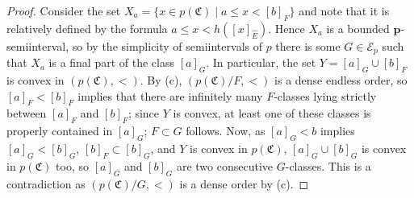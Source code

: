 \documentclass{amsart}
\theoremstyle{definition}
\theoremstyle{definition}
\newcommand{\Mon}{\mathfrak C}
\begin{document}
\begin{proof}
Consider the set $X_a=\{x\in p(\Mon)\mid a\leqslant x<[b]_F\}$ and note that it is relatively defined by the formula $a\leqslant x<h([x]_{\hat E})$. Hence $X_a$ is
a bounded $\mathbf p$-semiinterval, so by the simplicity of semiintervals of $p$ there is some $G\in\mathcal E_p$ such that $X_a$ is a final part of the class $[a]_G$. In particular, the set $Y=[a]_G\cup [b]_F$ is convex in $(p(\Mon),<)$. By (c), $(p(\Mon)/F,<)$ is a dense endless order, so $[a]_F<[b]_F$ implies that there are infinitely many $F$-classes lying strictly between $[a]_F$ and $[b]_F$; since $Y$ is convex, at least one of these classes is properly contained in $[a]_G$; $F\subset G$ follows. 
Now, as $[a]_G<b$ implies $[a]_G<[b]_G$, $[b]_F\subset[b]_G$, and $Y$ is convex in $p(\Mon)$, $[a]_G\cup[b]_G$ is convex in $p(\Mon)$ too, so $[a]_G$ and $[b]_G$ are two consecutive $G$-classes. This is a contradiction as $(p(\Mon)/G,<)$ is a dense order by (c).
\end{proof}
\end{document}
